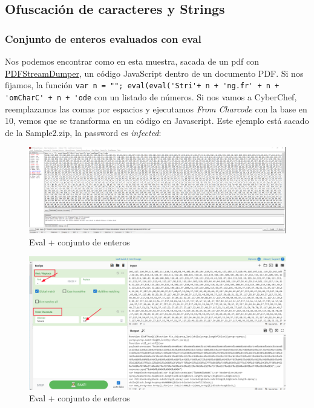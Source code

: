\documentclass[15pt]{article}
\begin{document}
	
	\subsection{Ofuscación de caracteres y Strings}
	\subsubsection{Conjunto de enteros evaluados con eval}
	Nos podemos encontrar como en esta muestra, sacada de un pdf con \href{ [pdfstreamdumper](http://sandsprite.com/blogs/index.php?uid=7&pid=57)}{PDFStreamDumper}, un código JavaScript dentro de un documento PDF. Si nos fijamos, la función \verb*|var n = ""; eval(eval('Stri'+ n + 'ng.fr' + n + 'omCharC' + n + 'ode| con un listado de números. Si nos vamos a CyberChef, reemplazamos las comas por espacios y ejecutamos \textit{From Charcode} con la base en 10, vemos que se transforma en un código en Javascript. Este ejemplo está sacado de la Sample2.zip, la password es \textit{infected}:
	\begin{figure}[H]
		\centering
		\includegraphics[width=18cm]{images/pdf1.png}
		\caption{Eval + conjunto de enteros}
	\end{figure}
	\begin{figure}[H]
		\centering
		\includegraphics[width=15cm]{images/pdf2.png}
		\caption{Eval + conjunto de enteros}
	\end{figure}
\end{document}
